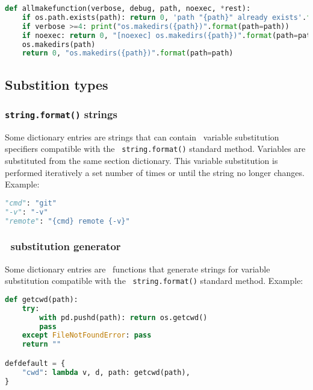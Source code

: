 \begin{snugshade}
\begin{lstlisting}[language=python]
def allmakefunction(verbose, debug, path, noexec, *rest):
	if os.path.exists(path): return 0, 'path "{path}" already exists'.format(path=path)
	if verbose >=4: print("os.makedirs({path})".format(path=path))
	if noexec: return 0, "[noexec] os.makedirs({path})".format(path=path)
	os.makedirs(path)
	return 0, "os.makedirs({path})".format(path=path)
\end{lstlisting}
\end{snugshade}

\subsection{Substition types}

\subsubsection{\lstinline{string.format()} strings}

Some dictionary entries are strings that can contain \Python\ variable substitution specifiers compatible with the \Python\ \lstinline{string.format()} standard method. Variables are substituted from the same section dictionary. This variable substitution is performed iteratively a set number of times or until the string no longer changes. Example:

\begin{snugshade}
\begin{lstlisting}[language=python]
"cmd": "git"
"-v": "-v"
"remote": "{cmd} remote {-v}"
\end{lstlisting}
\end{snugshade}

\subsubsection{\Python\ substitution generator}
Some dictionary entries are \Python\ functions that generate strings for variable substitution compatible with the \Python\ \lstinline{string.format()} standard method. Example:

\begin{snugshade}
\begin{lstlisting}[language=python]
def getcwd(path):
	try:
		with pd.pushd(path): return os.getcwd()
		pass
	except FileNotFoundError: pass
	return ""

defdefault = {
	"cwd": lambda v, d, path: getcwd(path),
}
\end{lstlisting}
\end{snugshade}

